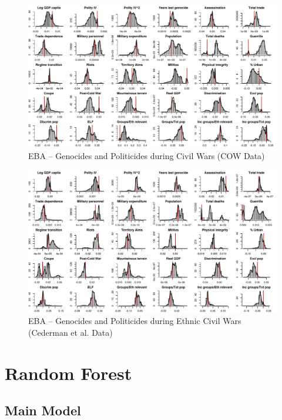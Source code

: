 \documentclass[a4paper,12pt]{article}
\begin{document}
\begin{figure}
    \centering
    \includegraphics[width=.98\textheight, angle=90]{images/uamk-cow.pdf}
    \caption{EBA -- Genocides and Politicides during Civil Wars (COW Data)}
    \label{fig:uamk-cow}
\end{figure}

\begin{figure}
    \centering
    \includegraphics[width=.98\textheight, angle=90]{images/uamk-eth.pdf}
    \caption{EBA -- Genocides and Politicides during Ethnic Civil Wars (Cederman et al. Data)}
    \label{fig:uamk-eth}
\end{figure}

\newpage

\section{Random Forest}
\label{sec:mk-rfe}

\subsection{Main Model}
\end{document}
